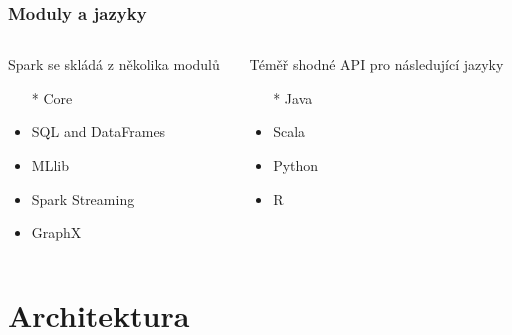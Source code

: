 \documentclass[xcolor=dvipsnames,compact]{beamer}
\begin{document}
\begin{frame}
	\frametitle{Moduly a jazyky}
	\begin{columns}[T] %
		\begin{column}{.48\textwidth}
			Spark se skládá z několika modulů
			\begin{itemize}
				\item[*] Core
				\item SQL and DataFrames
				\item MLlib
				\item Spark Streaming
				\item GraphX
			\end{itemize}
		\end{column}
		\begin{column}{.48\textwidth}
			Téměř shodné API pro následující jazyky
			\begin{itemize}
				\item[*] Java
				\item Scala
				\item Python
				\item R
			\end{itemize}
		\end{column}
	\end{columns}
\end{frame}

\section{Architektura}
\end{document}
